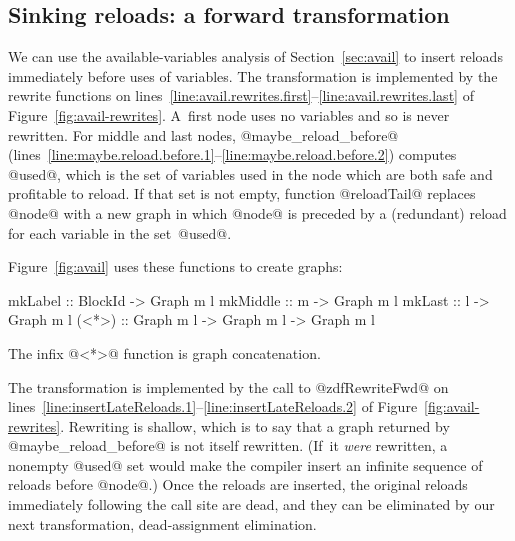 \documentclass[blockstyle,preprint,natbib,nocopyrightspace]{sigplanconf}
\newcommand\linerangeref[2]{\mbox{lines~\ref{line:#1}--\ref{line:#2}}}
\newcommand{\authornote}[1]{{\em #1}}
\def\authornote#1{\unskip\relax}
\newcommand{\simon}[1]{\authornote{SLPJ: #1}}
\def\finalremark#1{\relax}
\newcommand\secref[1]{Section~\ref{sec:#1}}
\newcommand\seclabel[1]{\label{sec:#1}}
\newcommand\figref[1]{Figure~\ref{fig:#1}}
\begin{document}
\subsection{Sinking reloads: a forward transformation}

\finalremark{Incidentally, I wonder if we should
use record notation when constructing @ForwardRewrites@?}

\seclabel{sink-reloads}

We can use the available-variables analysis of \secref{avail} to
insert reloads
immediately before uses of variables.
The transformation is implemented by the rewrite functions on
\linerangeref{avail.rewrites.first}{avail.rewrites.last} of \figref{avail-rewrites}.
A~first node uses no variables and so is never rewritten.
For middle and last nodes, @maybe_reload_before@ 
(\linerangeref{maybe.reload.before.1}{maybe.reload.before.2})
computes @used@, which is the set
of variables used in the node which are both safe and profitable to
reload. 
If that set is not empty, function
@reloadTail@ replaces @node@ with a new graph in which @node@ is
preceded by a (redundant) reload for each variable in the set~@used@.

\figref{avail} uses these functions to create graphs:
\begin{code}
mkLabel  :: BlockId -> Graph m l
mkMiddle :: m       -> Graph m l
mkLast   :: l       -> Graph m l
(<*>)    :: Graph m l -> Graph m l -> Graph m l
\end{code}
The infix @<*>@ function is graph concatenation.

The transformation is implemented by the call to @zdfRewriteFwd@
on \linerangeref{insertLateReloads.1}{insertLateReloads.2} of \figref{avail-rewrites}.
Rewriting is shallow, which is to say that a graph returned by
@maybe_reload_before@ is not itself rewritten.
(If~it \emph{were} rewritten, a nonempty @used@ set would make the
compiler insert an infinite sequence of reloads before @node@.)
Once the reloads are inserted, the original reloads immediately
following the call site are dead, and they can be eliminated by our
next transformation, dead-assignment elimination.
\end{document}
